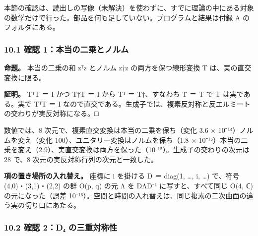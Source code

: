 \documentclass[
  a4paper,
]{ltjsarticle}
\begin{document}
本節の確認は、読出しの写像（未解決）を使わずに、すでに理論の中にある対象の数学だけで行った。部品を何も足していない。プログラムと結果は付録
A のフォルダにある。

\subsubsection{10.1 確認
1：本当の二乗とノルム}\label{ux78baux8a8d-1ux672cux5f53ux306eux4e8cux4e57ux3068ux30ceux30ebux30e0}

\textbf{命題。} 本当の二乗の和 zᵀz とノルム z†z の両方を保つ線形変換 T
は、実の直交変換に限る。

\textbf{証明。} TᵀT ＝ I かつ T†T ＝ I から Tᵀ ＝ T†、すなわち T̄ ＝ T で
T は実である。実で TᵀT ＝ I
なので直交である。生成子では、複素反対称と反エルミートの交わりが実反対称になる。□

数値では、8 次元で、複素直交変換は本当の二乗を保ち（変化 3.6 ×
10⁻¹⁴）ノルムを変え（変化 100）、ユニタリー変換はノルムを保ち（1.8 ×
10⁻¹⁵）本当の二乗を変え（2.9）、実直交変換は両方を保った（10⁻¹⁵）。生成子の交わりの次元は
28 で、8 次元の実反対称行列の次元と一致した。

\textbf{項の置き場所の入れ替え。} 座標に i を掛ける D ＝ diag(1, \ldots,
i, \ldots) で、符号 (4,0)・(3,1)・(2,2) の群 O(p, q) の元 Λ を DΛD⁻¹
に写すと、すべて同じ O(4, ℂ) の元になった（誤差
10⁻¹⁶）。空間と時間の入れ替えは、同じ複素の二次曲面の違う実の切り口にあたる。

\subsubsection{10.2 確認 2：D₄
の三重対称性}\label{ux78baux8a8d-2dux2084-ux306eux4e09ux91cdux5bfeux79f0ux6027}
\end{document}
